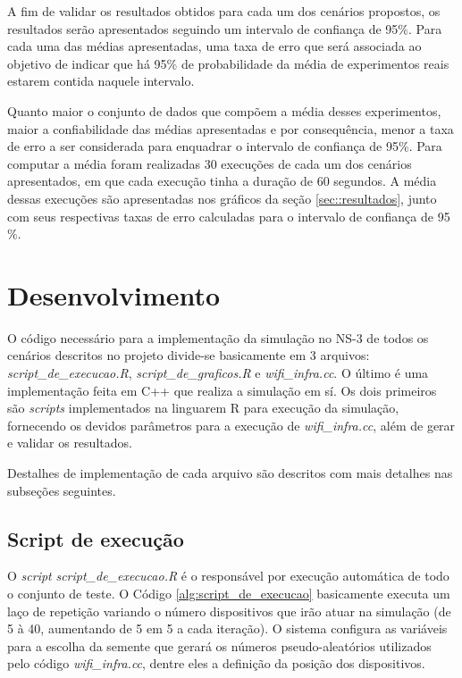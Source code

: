 \documentclass[12pt]{article}
\begin{document}
A fim de validar os resultados obtidos para cada um dos cenários propostos, os resultados serão apresentados seguindo um intervalo de confiança de 95$\%$. Para cada uma das médias apresentadas, uma taxa de erro que será associada ao objetivo de indicar que há 95$\%$ de probabilidade da média de experimentos reais estarem contida naquele intervalo.

Quanto maior o conjunto de dados que compõem a média desses experimentos, maior a confiabilidade das médias apresentadas e por consequência, menor a taxa de erro a ser considerada para enquadrar o intervalo de confiança de 95$\%$. Para computar a média foram realizadas 30 execuções de cada um dos cenários apresentados, em que cada execução tinha a duração de 60 segundos. A média dessas execuções são apresentadas nos gráficos da seção \ref{sec::resultados}, junto com seus respectivas taxas de erro calculadas para o intervalo de confiança de 95$\%$.

\section{Desenvolvimento}
\label{dev}

O código necessário para a implementação da simulação no NS-3 de todos os cenários descritos no projeto divide-se basicamente em 3 arquivos: \textit{script\_de\_execucao.R}, \textit{script\_de\_graficos.R} e \textit{wifi\_infra.cc}. O último é uma implementação feita em C++ que realiza a simulação em sí. Os dois primeiros são \textit{scripts} implementados na linguarem R para execução da simulação, fornecendo os devidos parâmetros para a execução de \textit{wifi\_infra.cc}, além de gerar e validar os resultados.

Destalhes de implementação de cada arquivo são descritos com mais detalhes nas subseções seguintes.

\subsection{Script de execução}

O \textit{script} \textit{script\_de\_execucao.R} é o responsável por execução automática de todo o conjunto de teste. O Código \ref{alg:script_de_execucao} basicamente executa um laço de repetição variando o número dispositivos que irão atuar na simulação (de 5 à 40, aumentando de 5 em 5 a cada iteração). O sistema configura as variáveis para a escolha da semente que gerará os números pseudo-aleatórios utilizados pelo código \textit{wifi\_infra.cc}, dentre eles a definição da posição dos dispositivos.
\end{document}
